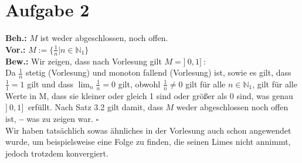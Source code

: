 \documentclass[12pt, a4paper]{article}
\newcommand*{\qed}{\null\nobreak\hfill\ensuremath{\square}}
\newcommand*{\gedanke}{\textbf{-- }}
\begin{document}
\section*{Aufgabe 2}
\textbf{Beh.:} \(M\) ist weder abgeschlossen, noch offen. \\
\textbf{Vor.:} \(M := \{\frac{1}{n} | n \in \mathbb{N}_1\}\) \\
\textbf{Bew.:} Wir zeigen, dass nach Vorlesung gilt \(M = ]\ 0,1 ]\ \):\\
Da \(\frac{1}{n}\) stetig (Vorlesung) und monoton fallend (Vorlesung) ist, sowie es gilt, dass \(\frac{1}{1} = 1\) gilt und dass \(\lim_{n} \frac{1}{n} = 0\) gilt, obwohl \(\frac{1}{n} \ne 0\) gilt für alle \(n \in \mathbb{N}_1\),
gilt für alle Werte in M, dass sie kleiner oder gleich 1 sind oder größer als 0 sind, was genau \(]\ 0,1 ]\ \) erfüllt.
Nach Satz 3.2 gilt damit, dass \(M\) weder abgeschlossen noch offen ist, \gedanke was zu zeigen war. \qed\\
Wir haben tatsächlich sowas ähnliches in der Vorlesung auch schon angewendet wurde, um beispielsweise eine Folge zu finden, die seinen Limes nicht annimmt, jedoch trotzdem konvergiert.
\end{document}
